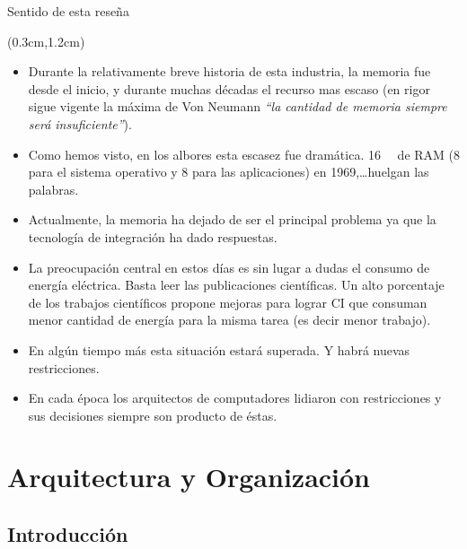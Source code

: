 \documentclass[table,dvipsnames,aspectratio=169]{beamer}
\begin{document}
\begin{frame}{Sentido de esta reseña}
 \begin{textblock*}{\textwidth}(0.3cm,1.2cm)
  \begin{itemize}[<+->]\justifying
   \item Durante la relativamente \textcolor{furfiBlue}{breve} historia de esta industria, la memoria fue desde el inicio, y durante muchas décadas el recurso mas escaso 
   {\small (en rigor sigue vigente la máxima de Von Neumann \textit{``la cantidad de memoria siempre será insuficiente''}).}
   \item Como hemos visto, en los albores esta escasez fue dramática. \SI{16}{\kibi\byte} de RAM (8 para el sistema operativo y 8 para las aplicaciones) en 1969,\dots huelgan las palabras.
   \item \textcolor{furfiBlue}{Actualmente, la memoria ha dejado de ser el principal problema ya que la tecnología de integración ha dado respuestas.}
   \item La preocupación central en estos días es sin lugar a dudas el \textcolor{furfiBlue}{consumo de energía eléctrica}. Basta leer las publicaciones científicas. 
   Un alto porcentaje de los trabajos científicos propone mejoras para lograr CI que consuman menor cantidad de energía para la misma tarea (es decir menor trabajo).
   \item En algún tiempo más esta situación estará superada. \textcolor{furfiBlue}{Y habrá nuevas restricciones.}
   \item \textcolor{furfiGreen}{En cada época los arquitectos de computadores lidiaron con restricciones y sus decisiones siempre son producto de éstas.}
  \end{itemize}
 \end{textblock*}
\end{frame}

\section{Arquitectura y Organización}
\subsection{Introducción}
\end{document}
